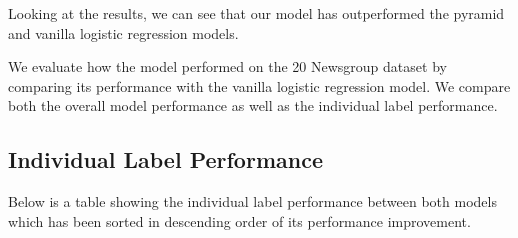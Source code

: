 Looking at the results, we can see that our model has outperformed the pyramid and vanilla logistic regression models.

We evaluate how the model performed on the 20 Newsgroup dataset by comparing its performance with the vanilla logistic regression model. We compare both the overall model performance as well as the individual label performance.

\subsection{Individual Label Performance}

Below is a table showing the individual label performance between both models which has been sorted in descending order of its performance improvement.\\

